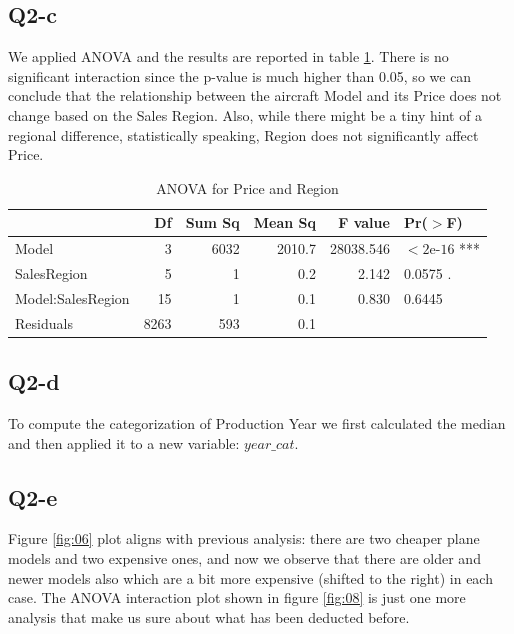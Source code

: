 \subsection{Q2-c}

We applied ANOVA and the results are reported in table \ref{tab:05}. There is no significant interaction since the p-value is much higher than 0.05, so we can conclude that the relationship between the aircraft Model and its Price does not change based on the Sales Region. Also, while there might be a tiny hint of a regional difference, statistically speaking, Region does not significantly affect Price.

\begin{table}[h]
    \centering
    \begin{tabular}{l r r r r l}
        \hline
         & Df & Sum Sq & Mean Sq & F value & Pr($>$F) \\ 
        \hline
        Model             & 3    & 6032 & 2010.7 & 28038.546 & $< 2\text{e-}16$ *** \\
        SalesRegion       & 5    & 1    & 0.2    & 2.142     & 0.0575 . \\
        Model:SalesRegion & 15   & 1    & 0.1    & 0.830     & 0.6445 \\
        Residuals         & 8263 & 593  & 0.1    &           & \\ 
        \hline
    \end{tabular}
    \caption{ANOVA for Price and Region}
    \label{tab:05}
\end{table}

\subsection{Q2-d}

To compute the categorization of Production Year we first calculated the median and then applied it to a new variable: $year\_cat$.

\subsection{Q2-e}

Figure \ref{fig:06} plot aligns with previous analysis: there are two cheaper plane models and two expensive ones, and now we observe that there are older and newer models also which are a bit more expensive (shifted to the right) in each case.
The ANOVA interaction plot shown in figure \ref{fig:08} is just one more analysis that make us sure about what has been deducted before.


